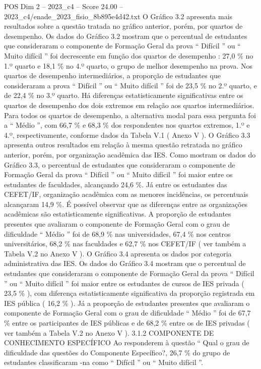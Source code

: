 \begin{textsample}{POS Dim 2 – 2023\_c4 – Score 24.00 – 2023\_c4/enade\_2023\_fisio\_8b895e4d42.txt}
O Gráfico 3.2 apresenta mais resultados sobre a questão tratada no gráfico anterior, porém, por quartos de desempenho.
Os dados do Gráfico 3.2 mostram que o percentual de estudantes que consideraram o componente de Formação Geral da prova “ Difícil ” ou “ Muito difícil ” foi decrescente em função dos quartos de desempenho : 27,0 \% no 1.º quarto e 18,1 \% no 4.º quarto, o grupo de melhor desempenho na prova.
Nos quartos de desempenho intermediários, a proporção de estudantes que consideraram a prova “ Difícil ” ou “ Muito difícil ” foi de 23,5 \% no 2.º quarto, e de 22,4 \% no 3.º quarto.
Há diferenças estatisticamente significativas entre os quartos de desempenho dos dois extremos em relação aos quartos intermediários.
Para todos os quartos de desempenho, a alternativa modal para essa pergunta foi a “ Médio ”, com 66,7 \% e 68,3 \% dos respondentes nos quartos extremos, 1.º e 4.º, respectivamente, conforme dados da Tabela V.1 ( Anexo V ).
O Gráfico 3.3 apresenta outros resultados em relação à mesma questão retratada no gráfico anterior, porém, por organização acadêmica das IES.
Como mostram os dados do Gráfico 3.3, o percentual de estudantes que consideraram o componente de Formação Geral da prova “ Difícil ” ou “ Muito difícil ” foi maior entre os estudantes de faculdades, alcançando 24,6 \%.
Já entre os estudantes das CEFET/IF, organização acadêmica com as menores incidências, os percentuais alcançaram 14,9 \%.
É possível observar que as diferenças entre as organizações acadêmicas são estatisticamente significativas.
A proporção de estudantes presentes que avaliaram o componente de Formação Geral com o grau de dificuldade “ Médio ” foi de 68,9 \% nas universidades, 67,4 \% nos centros universitários, 68,2 \% nas faculdades e 62,7 \% nos CEFET/IF ( ver também a Tabela V.2 no Anexo V ).
O Gráfico 3.4 apresenta os dados por categoria administrativa das IES.
Os dados do Gráfico 3.4 mostram que o percentual de estudantes que consideraram o componente de Formação Geral da prova “ Difícil ” ou “ Muito difícil ” foi maior entre os estudantes de cursos de IES privada ( 23,5 \% ), com diferença estatisticamente significativa da proporção registrada em IES pública ( 16,2 \% ).
Já a proporção de estudantes presentes que avaliaram o componente de Formação Geral com o grau de dificuldade “ Médio ” foi de 67,7 \% entre os participantes de IES públicas e de 68,2 \% entre os de IES privadas ( ver também a Tabela V.2 no Anexo V ). 3.1.2 COMPONENTE DE CONHECIMENTO ESPECÍFICO Ao responderem à questão “ Qual o grau de dificuldade das questões do Componente Específico?, 26,7 \% do grupo de estudantes classificaram -na como “ Difícil ” ou “ Muito difícil ”.

\end{textsample}
